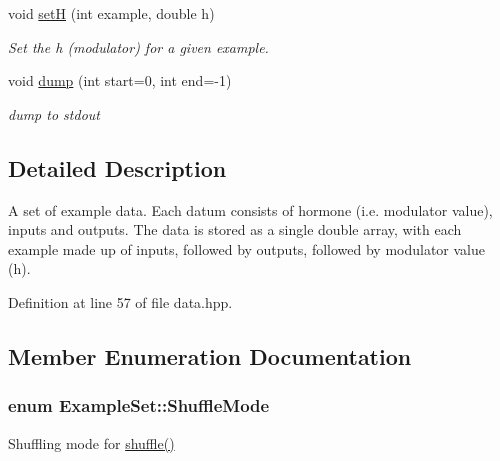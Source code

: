 \begin{DoxyCompactItemize}
void \hyperlink{classExampleSet_a8fa30270c775be95ae69fae9cec3e9bc}{setH} (int example, double h)
\begin{DoxyCompactList}\small\item\em Set the h (modulator) for a given example. \end{DoxyCompactList}\item 
void \hyperlink{classExampleSet_a15a6c0897780abd8c421691bcc43f711}{dump} (int start=0, int end=-\/1)
\begin{DoxyCompactList}\small\item\em dump to stdout \end{DoxyCompactList}\end{DoxyCompactItemize}


\subsection{Detailed Description}
A set of example data. Each datum consists of hormone (i.\+e. modulator value), inputs and outputs. The data is stored as a single double array, with each example made up of inputs, followed by outputs, followed by modulator value (h). 

Definition at line 57 of file data.\+hpp.



\subsection{Member Enumeration Documentation}
\subsubsection[{\texorpdfstring{Shuffle\+Mode}{ShuffleMode}}]{\setlength{\rightskip}{0pt plus 5cm}enum {\bf Example\+Set\+::\+Shuffle\+Mode}}\hypertarget{classExampleSet_afcdcdbc9a02c53864997e334d8bae33d}{}\label{classExampleSet_afcdcdbc9a02c53864997e334d8bae33d}


Shuffling mode for \hyperlink{classExampleSet_a2df897c759c7cc03475f68fd1f4834b9}{shuffle()} 

